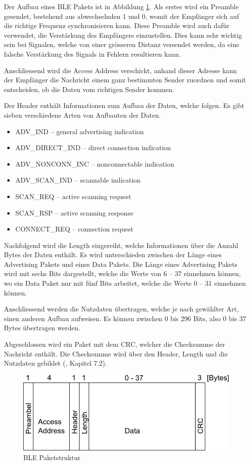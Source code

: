 Der Aufbau eines BLE Pakets ist in Abbildung \ref{ble_paket}. Als erstes wird ein Preamble gesendet, bestehend aus abwechselnden 1 und 0, womit der Empfänger sich auf die richtige Frequenz synchronisieren kann. Diese Preamble wird auch dafür verwendet, die Verstärkung des Empfängers einzustellen. Dies kann sehr wichtig sein bei Signalen, welche von einer grösseren Distanz versendet werden, da eine falsche Verstärkung des Signals in Fehlern resultieren kann.

Anschliessend wird die Access Address verschickt, anhand dieser Adresse kann der Empfänger die Nachricht einem ganz bestimmten Sender zuordnen und somit entscheiden, ob die Daten vom richtigen Sender kommen.

Der Header enthält Informationen zum Aufbau der Daten, welche folgen. Es gibt sieben verschiedene Arten von Aufbauten der Daten.

\begin{itemize}
    \item ADV\_IND – general advertising indication
    \item ADV\_DIRECT\_IND – direct connection indication
    \item ADV\_NONCONN\_INC – nonconnectable indication
    \item ADV\_SCAN\_IND – scannable indication
    \item SCAN\_REQ – active scanning request
    \item SCAN\_RSP – active scanning response
    \item CONNECT\_REQ – connection request
\end{itemize}

Nachfolgend wird die Length eingereiht, welche Informationen über die Anzahl Bytes der Daten enthält. Es wird unterschieden zwischen der Länge eines Advertising Pakets und eines Data Pakets. Die Länge eines Advertising Pakets wird mit sechs Bits dargestellt, welche die Werte von 6 – 37 einnehmen können, wo ein Data Paket nur mit fünf Bits arbeitet, welche die Werte 0 – 31 einnehmen können.

Anschliessend werden die Nutzdaten übertragen, welche je nach gewählter Art, einen anderen Aufbau aufweisen. Es können zwischen 0 bis 296 Bits, also 0 bis 37 Bytes übertragen werden. 

Abgeschlossen wird ein Paket mit dem CRC, welcher die Checksumme der Nachricht enthält. Die Checksumme wird über den Header, Length und die Nutzdaten gebildet (\cite{BLE_Book}, Kapitel 7.2).


\begin{figure}[ht]
    \includegraphics[width=1.0\textwidth]{2TheoretischeGrundlagen/imag/BLE_Paketstruktur.png}
    \caption{BLE Paketstruktur}
    \label{ble_paket} 
\end{figure}



